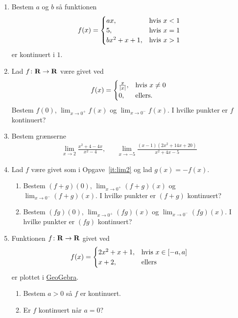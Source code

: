 \begin{enumerate}
	
	\item Bestem $a$ og $b$ så funktionen
	\begin{align*}
	f(x)=\begin{cases}
	ax,&\textup{hvis } x<1\\
	5,&\textup{hvis } x=1\\
	bx^2+x+1,& \textup{hvis }x>1
	\end{cases}
	\end{align*}
	er kontinuert i $1$.
	
	\item\label{it:lim2} Lad $f\colon \mathbf{R}\to \mathbf{R}$ være givet ved
	\begin{align*}
	f(x)=\begin{cases}
	\frac{x}{\vert x\vert},&\textup{hvis } x\neq 0\\
	0 ,& \textup{ellers}.
	\end{cases}
	\end{align*}
	Bestem $ f(0) $, $ \lim_{x\to 0^+}f(x) $ og $\lim_{x\to 0^-}f(x)$. I hvilke punkter er $f$ kontinuert?
	
	\item Bestem grænserne
	\begin{align*}
	\lim_{x\to 2} \frac{x^2+4-4x}{x^2-4},&& \lim_{x\to -5} \frac{(x-1)(2x^2+14x+20)}{x^2+4x-5}
	\end{align*}
	
	\item Lad $f$ være givet som i Opgave~\ref{it:lim2} og lad $g(x)=-f(x)$. 
	\begin{enumerate}
		\item Bestem $ (f+g)(0) $, $ \lim_{x\to 0^+}(f+g)(x) $ og $\lim_{x\to 0^-}(f+g)(x)$. I hvilke punkter er $(f+g)$ kontinuert?
		\item Bestem $ (fg)(0) $, $ \lim_{x\to 0^+}(fg)(x) $ og $\lim_{x\to 0^-}(fg)(x)$. I hvilke punkter er $(fg)$ kontinuert?
	\end{enumerate}
	
	\item Funktionen $f\colon \mathbf{R}\to \mathbf{R}$ givet ved 
	\begin{align*}
	f(x)=\begin{cases}
	2x^2+x+1,&\textup{hvis } x\in [-a,a]\\
	x+2,&\textup{ellers}
	\end{cases}
	\end{align*}
	er plottet i \href{https://www.geogebra.org/m/mAmaHPC6}{GeoGebra}.
	\begin{enumerate}
		\item Bestem $a>0$ så $f$ er kontinuert.
		\item Er $f$ kontinuert når $a=0$?
	\end{enumerate}


\end{enumerate}
